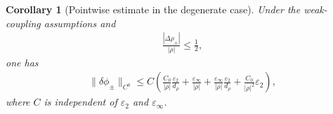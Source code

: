 \documentclass[10pt]{article}
\numberwithin{equation}{section}
\newtheorem{corollary}{Corollary}[theorem]
\begin{document}
\begin{corollary}[Pointwise estimate in the degenerate case]
\label{cor:directC0_deg}
Under the weak-coupling assumptions and
\begin{align*}
    \frac{|\Delta\rho_\pm|}{|\rho|}
    \leq
    \frac12,
\end{align*}
one has
\begin{align*}
    \|\delta\phi_\pm\|_{C^0}
    \leq
    C\left(
    \frac{C_0}{|\rho|}\frac{\varepsilon_2}{d_\rho}
    +
    \frac{\varepsilon_\infty}{|\rho|}
    +
    \frac{\varepsilon_\infty}{|\rho|}\frac{\varepsilon_2}{d_\rho}
    +
    \frac{C_0}{|\rho|^2}\varepsilon_2
    \right),
\end{align*}
where $C$ is independent of $\varepsilon_2$ and $\varepsilon_\infty$.
\end{corollary}







{}
\end{document}
